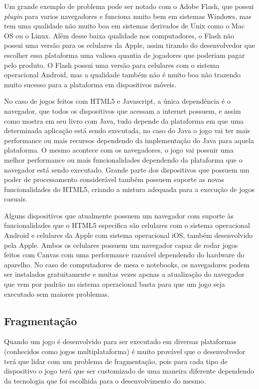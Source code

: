 Um grande exemplo de problema pode ser notado com o Adobe Flash, que possui
\textit{plugin} para varios navegadores e funciona muito bem em sistemas Windows,
mas tem uma qualidade não muito boa em sistemas derivados de Unix como
o Mac OS ou o Linux. Além desse baixa qualidade nos computadores, o
Flash não possui uma versão para os celulares da Apple, assim tirando
do desenvolvedor que escolher essa plataforma uma valiosa quantia de
jogadores que poderiam pagar pelo produto. O Flash possui uma versão
para celulares com o sistema operacional Android, mas a qualidade
também não é muito boa não trazendo muito sucesso para a plataforma em
dispositivos móveis.

No caso de jogos feitos com HTML5 e Javascript, a única dependência é
o navegador, que todos os dispositivos que acessam a internet possuem,
e assim como  mostra em seu livro com
Java, tudo depende da plataforma em que uma determinada aplicação está
sendo executada, no caso do Java o jogo vai ter mais performance ou
mais recursos dependendo da implementação do Java para aquela
plataforma. O mesmo acontece com os navegadores, o jogo vai possuir
uma melhor performance ou mais funcionalidades dependendo da plataforma que
o navegador está sendo executado. Grande parte dos dispositivos que
possuem um poder de processamento considerável também possuem suporte
as novas funcionalidades do HTML5, criando a mistura adequada para a
execução de jogos casuais.

Alguns dispositivos que atualmente possuem um navegador com suporte às
funcionalidades que o HTML5 especifica são celulares com o sistema
operacional Android e celulares da Apple com sistema operacional iOS,
também desenvolvido pela Apple.
Ambos os celulares possuem um navegador capaz de rodar jogos feitos
com Canvas com uma performance razoável dependendo do hardware do
aparelho. No caso de computadores de mesa e notebooks, os navegadores
podem ser instalados gratuitamente e muitas vezes apenas a atualização
do navegador que vem por padrão no sistema operacional basta para que
um jogo seja executado sem maiores problemas.

\subsection{Fragmentação}

Quando um jogo é desenvolvido para ser executado em diversas plataformas
(conhecidos como jogos multiplataforma) é muito provável que o
desenvolvedor terá que lidar com um problema de fragmentação, pois
para cada tipo de dispositivo o jogo terá que ser customizado de uma
maneira diferente dependendo da tecnologia que foi escolhida para o
desenvolvimento do mesmo.

